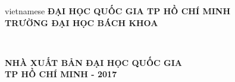 \begin{titlepage}

\begin{center}

\vspace*{2\bigskipamount}

\begin{otherlanguage*}{vietnamese}
\makeatletter
{\Large\titlefont\bfseries ĐẠI HỌC QUỐC GIA TP HỒ CHÍ MINH}\\
{\Large\titlefont\bfseries TRƯỜNG ĐẠI HỌC BÁCH KHOA}

{\Large\titlefont\bfseries\@firstname\ {\titleshape\@lastname}}
\makeatother
\end{otherlanguage*}

\vspace{4cm}
{\makeatletter
\titlestyle\bfseries\LARGE\@title
\makeatother}

{\makeatletter
\ifx\@subtitle\undefined\else
    \bigskip
    \titlefont\titleshape\Large\@subtitle
\fi
\makeatother}

\vfill

{\Large\titlefont\bfseries NHÀ XUẤT BẢN ĐẠI HỌC QUỐC GIA}\\
{\Large\titlefont\bfseries TP HỒ CHÍ MINH - 2017}
\end{center}

\cleardoublepage
\thispagestyle{empty}


\clearpage
\thispagestyle{empty}

\end{titlepage}

